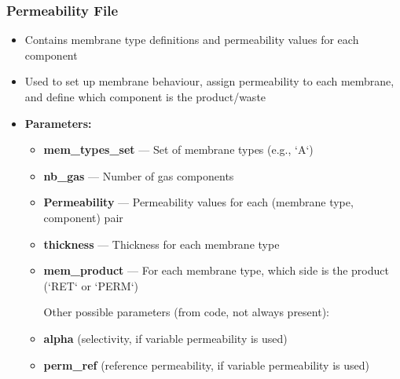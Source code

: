 \documentclass[12pt]{article}
\theoremstyle{definition}
\theoremstyle{definition}
\theoremstyle{remark}
\theoremstyle{remark}
\theoremstyle{definition}
\theoremstyle{remark}
\begin{document}
\subsubsection{Permeability File}
\begin{itemize}
	\item Contains membrane type definitions and permeability values for each component
	\item Used to set up membrane behaviour, assign permeability to each membrane, and define which component is the product/waste
	\item \textbf{Parameters:}
		\begin{itemize}
\item \textbf{mem\_types\_set }— Set of membrane types (e.g., `A`)

\item \textbf{nb\_gas }— Number of gas components
\item \textbf{Permeability }— Permeability values for each (membrane type, component) pair
\item \textbf{thickness }— Thickness for each membrane type
\item \textbf{mem\_product }— For each membrane type, which side is the product (`RET` or `PERM`)

Other possible parameters (from code, not always present):
\item \textbf{alpha }(selectivity, if variable permeability is used)
\item \textbf{perm\_ref }(reference permeability, if variable permeability is used)

			
		\end{itemize}
	
\end{itemize}
\end{document}
